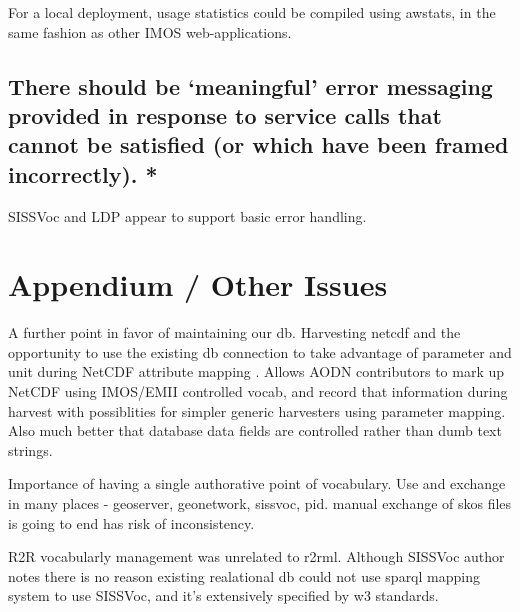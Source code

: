 \documentclass[10pt,a4paper]{article}
\begin{document}
\begin{flushleft}
  \item For a local deployment, usage statistics could be compiled using awstats, in the same fashion as other 
  IMOS web-applications. 



\subsection{ 
There should be ‘meaningful’ error messaging provided in response to
service calls that cannot be satisfied (or which have been framed incorrectly).
* }

  \item SISSVoc and LDP appear to support basic error handling.


\clearpage

\section{ 
  Appendium / Other Issues  }

  \item A further point in favor of maintaining our db. 
  Harvesting netcdf and the opportunity to use the existing db connection to take advantage of parameter and unit during
    NetCDF attribute mapping .  Allows AODN contributors to mark up NetCDF using IMOS/EMII controlled vocab, and record that
  information during harvest with possiblities for simpler generic harvesters using parameter mapping. Also 
  much better that database data fields are controlled rather than dumb text strings. 

 
 \item Importance of having a single authorative point of vocabulary. Use and exchange in many places - geoserver, geonetwork, sissvoc, pid. 
    manual exchange of skos files is going to end has risk of inconsistency. 
 
 \item R2R vocabularly management was unrelated to r2rml. Although SISSVoc author notes there is no reason existing realational db could not use 
  sparql mapping system to use SISSVoc, and it's extensively specified by w3 standards.
   




  \end{flushleft}
\end{document}
